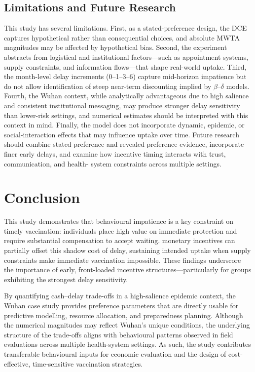 \documentclass[12pt]{article}
\begin{document}
\subsection{Limitations and Future Research}
This study has several limitations. First, as a stated-preference design, the DCE captures 
hypothetical rather than consequential choices, and absolute MWTA magnitudes may be affected 
by hypothetical bias. Second, the experiment 
abstracts from logistical and institutional factors—such as appointment systems, supply 
constraints, and information flows—that shape real-world uptake. Third, the month-level delay 
increments (0–1–3–6) capture mid-horizon impatience but do not allow identification of steep 
near-term discounting implied by $\beta$--$\delta$ models. Fourth, the Wuhan context, while 
analytically advantageous due to high salience and consistent institutional messaging, may 
produce stronger delay sensitivity than lower-risk settings, and numerical estimates should 
be interpreted with this context in mind. Finally, the model does not incorporate dynamic, 
epidemic, or social-interaction effects that may influence uptake over time. Future research 
should combine stated-preference and revealed-preference evidence, incorporate finer early 
delays, and examine how incentive timing interacts with trust, communication, and health-
system constraints across multiple settings.

\section{Conclusion}

This study demonstrates that behavioural impatience is a key constraint on timely vaccination: individuals place high value on immediate protection and require substantial compensation to accept waiting. monetary incentives can partially offset this shadow cost of delay, sustaining intended uptake when supply constraints make immediate vaccination impossible. These findings underscore the importance of early, front-loaded incentive structures—particularly for groups exhibiting the strongest delay sensitivity.

By quantifying cash–delay trade-offs in a high-salience epidemic context, the Wuhan case study provides preference parameters that are directly usable for predictive modelling, resource allocation, and preparedness planning. Although the numerical magnitudes may reflect Wuhan’s unique conditions, the underlying structure of the trade-offs aligns with behavioural patterns observed in field evaluations across multiple health-system settings. As such, the study contributes transferable behavioural inputs for economic evaluation and the design of cost-effective, time-sensitive vaccination strategies.
\end{document}
